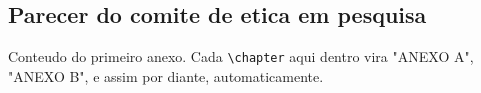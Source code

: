 %
%
%

\begin{anexosenv}

  \partanexos

  \chapter{Parecer do comite de etica em pesquisa}
  \label{anx:parecer}

  Conteudo do primeiro anexo. Cada \verb|\chapter| aqui dentro vira
  "ANEXO A", "ANEXO B", e assim por diante, automaticamente.

\end{anexosenv}
